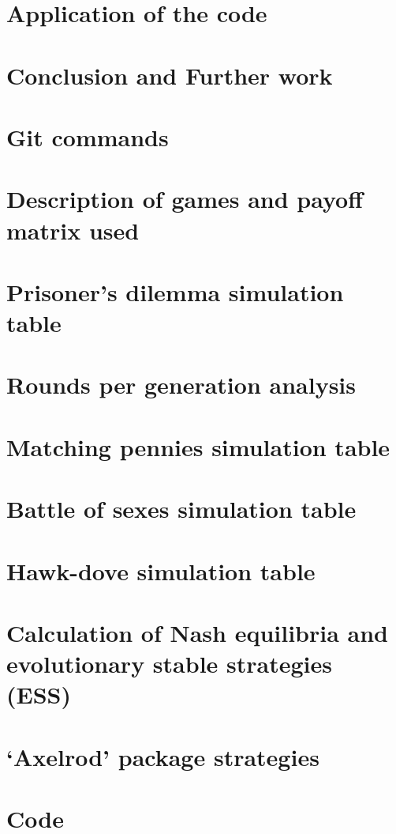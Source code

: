 \documentclass[12pt]{report}
\begin{document}
\chapter{Application of the code}


\chapter{Conclusion and Further work}


\appendix
\chapter{Git commands}


\chapter{Description of games and payoff matrix used}


\chapter{Prisoner's dilemma simulation table}


\chapter{Rounds per generation analysis}


\chapter{Matching pennies simulation table}


\chapter{Battle of sexes simulation table}


\chapter{Hawk-dove simulation table}


\chapter{Calculation of Nash equilibria and evolutionary stable strategies (ESS)}


\chapter{`Axelrod' package strategies}


\chapter{Code}


\newpage


\end{document}
